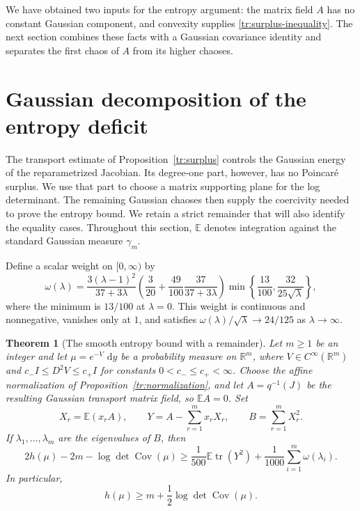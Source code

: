 \documentclass[11pt]{article}
\newtheorem{theorem}{Theorem}[section]
\theoremstyle{definition}
\theoremstyle{remark}
\numberwithin{equation}{section}
\begin{document}
We have obtained two inputs for the entropy argument: the matrix field
$A$ has no constant Gaussian component, and convexity supplies
\eqref{tr:surplus-inequality}.  The next section combines these facts
with a Gaussian covariance identity and separates the first chaos of
$A$ from its higher chaoses.

\section{Gaussian decomposition of the entropy deficit}
\label{mat:section}

The transport estimate of Proposition~\ref{tr:surplus} controls the
Gaussian energy of the reparametrized Jacobian.  Its degree-one part,
however, has no Poincar\'e surplus.  We use that part to choose a matrix
supporting plane for the log determinant.  The remaining Gaussian
chaoses then supply the coercivity needed to prove the entropy bound.
We retain a strict remainder that will also identify the equality cases.
Throughout this section, $\mathbb E$ denotes integration against the standard
Gaussian measure $\gamma_m$.

Define a scalar weight on $[0,\infty)$ by
\begin{equation}\label{mat:rigidity-weight}
 \omega(\lambda)=
 \frac{3(\lambda-1)^2}{37+3\lambda}
 \left(\frac3{20}+\frac{49}{100}\frac{37}{37+3\lambda}\right)
 \min\left\{\frac{13}{100},\frac{32}{25\sqrt\lambda}\right\},
\end{equation}
where the minimum is $13/100$ at $\lambda=0$.
This weight is continuous and nonnegative, vanishes only at $1$, and
satisfies $\omega(\lambda)/\sqrt\lambda\to24/125$ as
$\lambda\to\infty$.

\begin{theorem}[The smooth entropy bound with a remainder]
\label{mat:entropy-smooth}\label{prop:slack}
Let $m\ge1$ be an integer and let $\mu=e^{-V}\,\,\mathrm d y$ be a
probability measure on $\mathbb R^m$, where
$V\in C^\infty(\mathbb R^m)$ and
$c_-I\le D^2V\le c_+I$ for constants $0<c_-\le c_+<\infty$.
Choose the affine normalization of Proposition~\ref{tr:normalization},
and let $A=q^{-1}(J)$ be the resulting Gaussian transport matrix field,
so $\mathbb E A=0$.  Set
\[
 X_r=\mathbb E(x_rA),\qquad Y=A-\sum_{r=1}^m x_rX_r,\qquad
 B=\sum_{r=1}^mX_r^2.
\]
If $\lambda_1,\ldots,\lambda_m$ are the eigenvalues of $B$, then
\begin{equation}\label{mat:strict-remainder}
 2h(\mu)-2m-\log\det\operatorname{Cov}(\mu)
 \ge \frac1{500}\mathbb E\operatorname{tr}(Y^2)
       +\frac1{1000}\sum_{i=1}^m\omega(\lambda_i).
\end{equation}
In particular,
\[
 h(\mu)\ge m+\frac12\log\det\operatorname{Cov}(\mu).
\]
\end{theorem}
\end{document}
